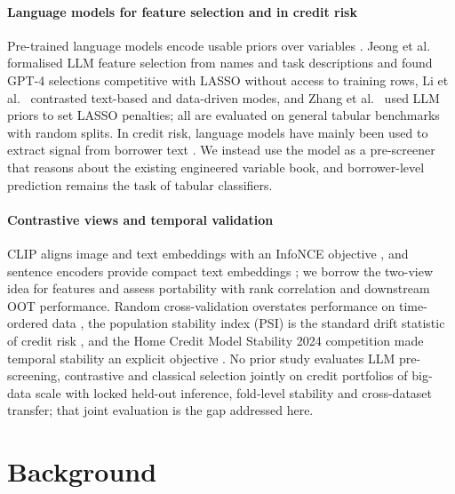\documentclass[final,5p,twocolumn]{elsarticle}
\begin{document}
\paragraph{Language models for feature selection and in credit risk}
Pre-trained language models encode usable priors over variables \cite{choi2022}. Jeong et al.\ \cite{jeong2025} formalised LLM feature selection from names and task descriptions and found GPT-4 selections competitive with LASSO without access to training rows, Li et al.\ \cite{li2025sigkdd} contrasted text-based and data-driven modes, and Zhang et al.\ \cite{zhang2025llmlasso} used LLM priors to set LASSO penalties; all are evaluated on general tabular benchmarks with random splits. In credit risk, language models have mainly been used to extract signal from borrower text \cite{sanzguerrero2025,xia2025}. We instead use the model as a pre-screener that reasons about the existing engineered variable book, and borrower-level prediction remains the task of tabular classifiers.

\paragraph{Contrastive views and temporal validation}
CLIP aligns image and text embeddings with an InfoNCE objective \cite{radford2021,oord2018}, and sentence encoders provide compact text embeddings \cite{reimers2019,wang2020minilm}; we borrow the two-view idea for features and assess portability with rank correlation \cite{spearman1904} and downstream OOT performance. Random cross-validation overstates performance on time-ordered data \cite{bergmeir2012,gama2014}, the population stability index (PSI) is the standard drift statistic of credit risk \cite{yurdakul2020}, and the Home Credit Model Stability 2024 competition made temporal stability an explicit objective \cite{homecredit2024}. No prior study evaluates LLM pre-screening, contrastive and classical selection jointly on credit portfolios of big-data scale with locked held-out inference, fold-level stability and cross-dataset transfer; that joint evaluation is the gap addressed here.


\section{Background}
\label{sec:background}
\end{document}
